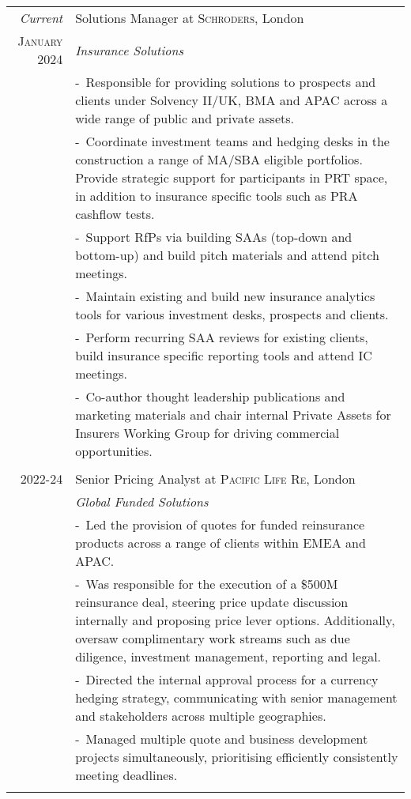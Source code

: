 \documentclass[a4paper,10pt]{article}
\newcommand{\blankline}{\multicolumn{1}{c}{}\\}
\newcommand{\projectitem}{\footnotesize-~\ignorespaces}
\begin{document}
\begin{tabularx}{\textwidth}{@{}r|>{\raggedright\arraybackslash}X@{}}
  \emph{Current} &Solutions Manager at \textsc{Schroders}, London \\
 \textsc{January 2024} & \emph{Insurance Solutions}\\
& \projectitem Responsible for providing solutions to prospects and clients under Solvency II/UK, BMA and APAC across a wide range of public and private assets.\\
 & \projectitem Coordinate investment teams and hedging desks in the construction a range of MA/SBA eligible portfolios. Provide strategic support for participants in PRT space, in addition to insurance specific tools such as PRA cashflow tests.\\
 & \projectitem Support RfPs via building SAAs (top-down and bottom-up) and build pitch materials and attend pitch meetings.\\
 & \projectitem Maintain existing and build new insurance analytics tools for various investment desks, prospects and clients.\\
 & \projectitem Perform recurring SAA reviews for existing clients, build insurance specific reporting tools and attend IC meetings.\\
  & \projectitem Co-author thought leadership publications and marketing materials and chair internal Private Assets for Insurers Working Group for driving commercial opportunities. \\
  \blankline

\textsc{2022-24} & Senior Pricing Analyst at \textsc{Pacific Life Re}, London \\
 & \emph{Global Funded Solutions}\\
 & \projectitem Led the provision of quotes for funded reinsurance products across a range of clients within EMEA and APAC. \\
  & \projectitem Was responsible for the execution of a \$500M reinsurance deal, steering price update discussion internally and proposing price lever options. Additionally, oversaw complimentary work streams such as due diligence, investment management, reporting and legal.\\
  & \projectitem Directed the internal approval process for a currency hedging strategy, communicating with senior management and stakeholders across multiple geographies. \\
  & \projectitem Managed multiple quote and business development projects simultaneously, prioritising efficiently consistently meeting deadlines.\\
  \blankline


\end{tabularx}
\end{document}
